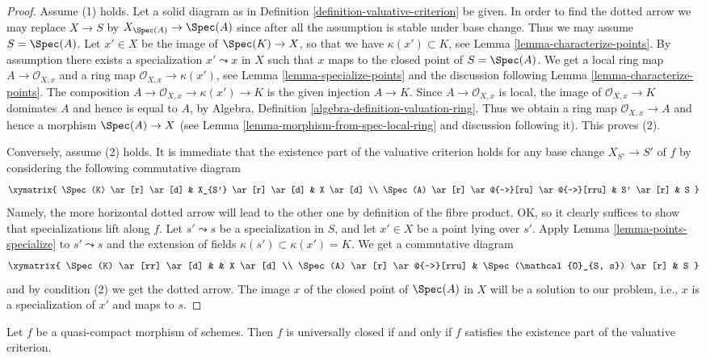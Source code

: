 \begin{proof}
Assume (1) holds. Let a solid diagram as in
Definition \ref{definition-valuative-criterion} be given.
In order to find the dotted arrow we may replace $X \to S$
by $X_{\Spec(A)} \to \Spec(A)$ since after all
the assumption is stable under base change.
Thus we may assume $S = \Spec(A)$.
Let $x' \in X$ be the image of $\Spec(K) \to X$, so
that we have $\kappa(x') \subset K$, see
Lemma \ref{lemma-characterize-points}.
By assumption there exists a specialization $x' \leadsto x$
in $X$ such that $x$ maps to the closed point of $S = \Spec(A)$.
We get a local ring map $A \to \mathcal{O}_{X, x}$ and a ring
map $\mathcal{O}_{X, x} \to \kappa(x')$, see
Lemma \ref{lemma-specialize-points} and the discussion following
Lemma \ref{lemma-characterize-points}. The composition
$A \to \mathcal{O}_{X, x} \to \kappa(x') \to K$ is the
given injection $A \to K$. Since $A \to \mathcal{O}_{X, x}$
is local, the image of $\mathcal{O}_{X, x} \to K$
dominates $A$ and hence is equal to $A$, by
Algebra, Definition \ref{algebra-definition-valuation-ring}.
Thus we obtain a ring map $\mathcal{O}_{X, x} \to A$ and
hence a morphism $\Spec(A) \to X$
(see Lemma \ref{lemma-morphism-from-spec-local-ring} and
discussion following it). This proves (2).

\medskip\noindent
Conversely, assume (2) holds. It is immediate that
the existence part of the valuative criterion holds for
any base change $X_{S'} \to S'$ of $f$ by considering
the following commutative diagram
$$
\xymatrix{
\Spec(K) \ar[r] \ar[d] & X_{S'} \ar[r] \ar[d] & X \ar[d] \\
\Spec(A) \ar[r] \ar@{-->}[ru] \ar@{-->}[rru] & S' \ar[r] & S
}
$$
Namely, the more horizontal dotted arrow will lead to the
other one by definition of the fibre product. OK, so it clearly
suffices to show that specializations lift along $f$.
Let $s' \leadsto s$ be a specialization in $S$, and let
$x' \in X$ be a point lying over $s'$. Apply
Lemma \ref{lemma-points-specialize}
to $s' \leadsto s$ and the extension of fields
$\kappa(s') \subset \kappa(x') = K$.
We get a commutative diagram
$$
\xymatrix{
\Spec(K) \ar[rr] \ar[d] & & X \ar[d] \\
\Spec(A) \ar[r] \ar@{-->}[rru] &
\Spec(\mathcal{O}_{S, s}) \ar[r] & S
}
$$
and by condition (2) we get the dotted arrow.
The image $x$ of the closed point of $\Spec(A)$
in $X$ will be a solution to our problem, i.e.,
$x$ is a specialization of $x'$ and maps to $s$.
\end{proof}

\begin{proposition}
\label{proposition-characterize-universally-closed}
Let $f$ be a quasi-compact morphism of schemes.
Then $f$ is universally closed if and only if $f$
satisfies the existence part of the valuative criterion.
\end{proposition}

